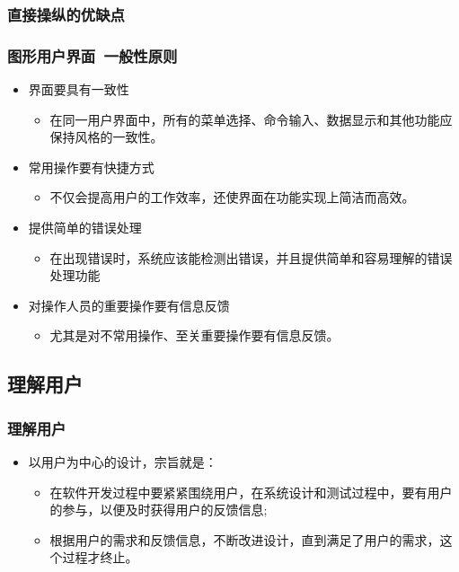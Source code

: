 \documentclass{beamer}
\begin{document}
\begin{frame}
	\frametitle{直接操纵的优缺点}

\end{frame}

\begin{frame}
	\frametitle{图形用户界面~{\small 一般性原则}}
	\beamertemplatetransparentcovereddynamicmedium
	\begin{itemize}[<+->]
		\item 界面要具有一致性
		\begin{itemize}
			\item 在同一用户界面中，所有的菜单选择、命令输入、数据显示和其他功能应保持风格的一致性。
		\end{itemize}
		\item 常用操作要有快捷方式
		\begin{itemize}
			\item 不仅会提高用户的工作效率，还使界面在功能实现上简洁而高效。
		\end{itemize}
		\item 提供简单的错误处理
		\begin{itemize}
			\item 在出现错误时，系统应该能检测出错误，并且提供简单和容易理解的错误处理功能
		\end{itemize}
		\item 对操作人员的重要操作要有信息反馈
		\begin{itemize}
			\item 尤其是对不常用操作、至关重要操作要有信息反馈。
		\end{itemize}
	\end{itemize}
\end{frame}

\subsection{理解用户}
\begin{frame}
	\frametitle{理解用户}
	\beamertemplatetransparentcovereddynamicmedium
	\begin{itemize}[<+->]
		\item 以用户为中心的设计，宗旨就是：
		\begin{itemize}
			\item 在软件开发过程中要紧紧围绕用户，在系统设计和测试过程中，要有用户的参与，以便及时获得用户的反馈信息;
			\item 根据用户的需求和反馈信息，不断改进设计，直到满足了用户的需求，这个过程才终止。
		\end{itemize}
	\end{itemize}
\end{frame}
\end{document}

